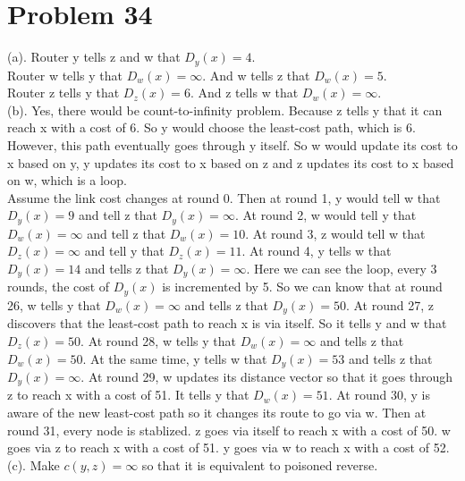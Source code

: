 \documentclass[titlepage, paper=a4, fontsize=11pt]{scrartcl} %
\numberwithin{equation}{section} %
\numberwithin{table}{section} %
\begin{document}

\section*{Problem 34}
(a).
Router y tells z and w that $D_y(x) = 4$. \\
Router w tells y that $D_w(x) = \infty$. And w tells z that $D_w(x) = 5$. \\
Router z tells y that $D_z(x) = 6$. And z tells w that $D_w(x) = \infty$. \\

(b).
Yes, there would be count-to-infinity problem. Because z tells y that it can reach x with a cost of 6. So y would choose the least-cost path, which is 6. However, this path eventually goes through y itself. So w would update its cost to x based on y, y updates its cost to x based on z and z updates its cost to x based on w, which is a loop. \\
Assume the link cost changes at round 0. Then at round 1, y would tell w that $D_y(x) = 9$ and tell z that $D_y(x)=\infty$. At round 2, w would tell y that $D_w(x) = \infty$ and tell z that $D_w(x) = 10$. At round 3, z would tell w that $D_z(x) = \infty$ and tell y that $D_z(x)=11$. At round 4, y tells w that $D_y(x)=14$ and tells z that $D_y(x)=\infty$. Here we can see the loop, every 3 rounds, the cost of $D_y(x)$ is incremented by 5. So we can know that at round 26, w tells y that $D_w(x) = \infty$ and tells z that $D_y(x)=50$. At round 27, z discovers that the least-cost path to reach x is via itself. So it tells y and w that $D_z(x) = 50$. At round 28, w tells y that $D_w(x)=\infty$ and tells z that $D_w(x)=50$. At the same time, y tells w that $D_y(x)=53$ and tells z that $D_y(x)=\infty$. At round 29, w updates its distance vector so that it goes through z to reach x with a cost of 51. It tells y that $D_w(x)=51$. At round 30, y is aware of the new least-cost path so it changes its route to go via w. Then at round 31, every node is stablized. z goes via itself to reach x with a cost of 50. w goes via z to reach x with a cost of 51. y goes via w to reach x with a cost of 52. \\

(c).
Make $c(y, z) = \infty$ so that it is equivalent to poisoned reverse. \\
\end{document}
